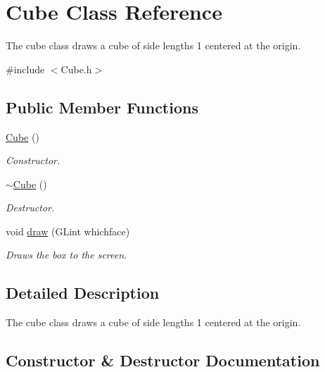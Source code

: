 \hypertarget{class_cube}{}\section{Cube Class Reference}
\label{class_cube}


The cube class draws a cube of side lengths 1 centered at the origin.  




{\ttfamily \#include $<$Cube.\+h$>$}

\subsection*{Public Member Functions}
\begin{DoxyCompactItemize}
\item 
\hyperlink{class_cube_a06f3d86fb63e3aad08623610aa3c17b4}{Cube} ()
\begin{DoxyCompactList}\small\item\em Constructor. \end{DoxyCompactList}\item 
\hyperlink{class_cube_aa814e979cecb8c451fdb332ded2cea1e}{$\sim$\+Cube} ()
\begin{DoxyCompactList}\small\item\em Destructor. \end{DoxyCompactList}\item 
\mbox{\label{class_cube_a593265c008b864a33e5889da5fbb4bd1}} 
void \hyperlink{class_cube_a593265c008b864a33e5889da5fbb4bd1}{draw} (G\+Lint whichface)
\begin{DoxyCompactList}\small\item\em Draws the box to the screen. \end{DoxyCompactList}\end{DoxyCompactItemize}


\subsection{Detailed Description}
The cube class draws a cube of side lengths 1 centered at the origin. 

\subsection{Constructor \& Destructor Documentation}
\mbox{\label{class_cube_a06f3d86fb63e3aad08623610aa3c17b4}} 
